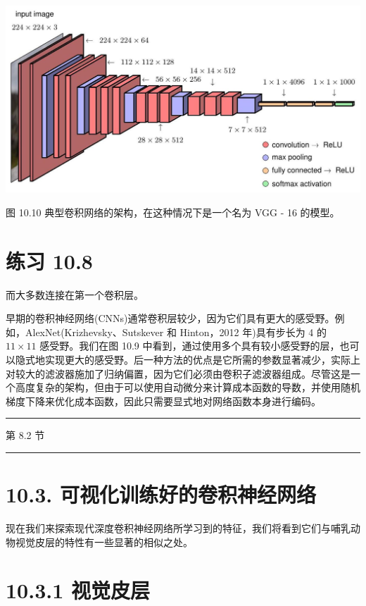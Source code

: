 \documentclass[10pt]{report}
\newcommand{\HRule}{\begin{center}\rule{0.9\linewidth}{0.2mm}\end{center}}
\begin{document}
\begin{center}
\includegraphics[max width=1.0\textwidth]{images/0194e279-9b28-703a-88f4-c3ac21e2010d_320_251_360_1294_682_0.jpg}
\end{center}
\hspace*{3em} 

图 10.10 典型卷积网络的架构，在这种情况下是一个名为 VGG - 16 的模型。

\section*{练习 10.8}

而大多数连接在第一个卷积层。

早期的卷积神经网络(CNNs)通常卷积层较少，因为它们具有更大的感受野。例如，AlexNet(Krizhevsky、Sutskever 和 Hinton，2012 年)具有步长为 4 的 \({11} \times  {11}\) 感受野。我们在图 10.9 中看到，通过使用多个具有较小感受野的层，也可以隐式地实现更大的感受野。后一种方法的优点是它所需的参数显著减少，实际上对较大的滤波器施加了归纳偏置，因为它们必须由卷积子滤波器组成。尽管这是一个高度复杂的架构，但由于可以使用自动微分来计算成本函数的导数，并使用随机梯度下降来优化成本函数，因此只需要显式地对网络函数本身进行编码。

\HRule

第 8.2 节

\HRule

\section*{10.3. 可视化训练好的卷积神经网络}

现在我们来探索现代深度卷积神经网络所学习到的特征，我们将看到它们与哺乳动物视觉皮层的特性有一些显著的相似之处。

\section*{10.3.1 视觉皮层}
\end{document}
